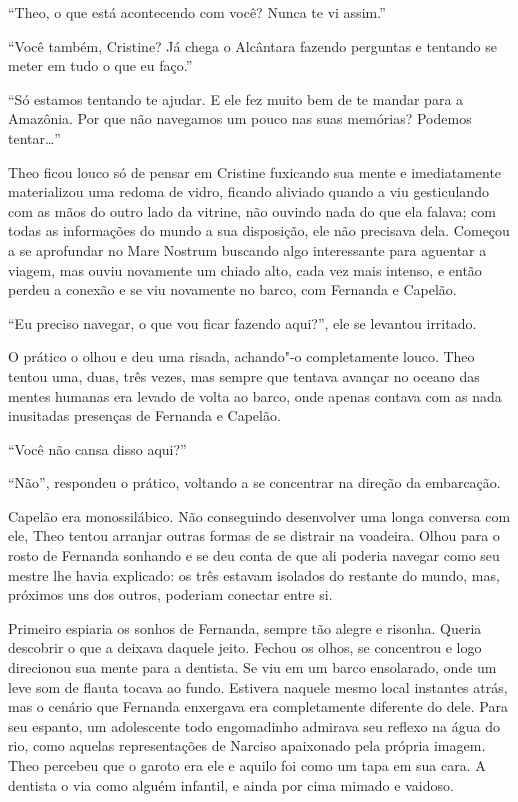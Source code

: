 ``Theo, o que está acontecendo com você? Nunca te vi assim.''

``Você também, Cristine? Já chega o Alcântara fazendo perguntas e
tentando se meter em tudo o que eu faço.''

``Só estamos tentando te ajudar. E ele fez muito bem de te mandar para a
Amazônia. Por que não navegamos um pouco nas suas memórias? Podemos
tentar\ldots{}''

Theo ficou louco só de pensar em Cristine fuxicando sua mente e
imediatamente materializou uma redoma de vidro, ficando aliviado quando
a viu gesticulando com as mãos do outro lado da vitrine, não ouvindo
nada do que ela falava; com todas as informações do mundo a sua
disposição, ele não precisava dela. Começou a se aprofundar no Mare
Nostrum buscando algo interessante para aguentar a viagem, mas ouviu
novamente um chiado alto, cada vez mais intenso, e então perdeu a conexão
e se viu novamente no barco, com Fernanda e Capelão.

``Eu preciso navegar, o que vou ficar fazendo aqui?'', ele se levantou
irritado.

O prático o olhou e deu uma risada, achando"-o completamente louco. Theo
tentou uma, duas, três vezes, mas sempre que tentava avançar no oceano
das mentes humanas era levado de volta ao barco, onde apenas contava com
as nada inusitadas presenças de Fernanda e Capelão.

``Você não cansa disso aqui?''

``Não'', respondeu o prático, voltando a se concentrar na direção da
embarcação.

Capelão era monossilábico. Não conseguindo desenvolver uma longa
conversa com ele, Theo tentou arranjar outras formas de se distrair na
voadeira. Olhou para o rosto de Fernanda sonhando e se deu conta de que
ali poderia navegar como seu mestre lhe havia explicado: os três estavam
isolados do restante do mundo, mas, próximos uns dos outros, poderiam
conectar entre si.

Primeiro espiaria os sonhos de Fernanda, sempre tão alegre e risonha.
Queria descobrir o que a deixava daquele jeito. Fechou os olhos, se
concentrou e logo direcionou sua mente para a dentista. Se viu em um
barco ensolarado, onde um leve som de flauta tocava ao fundo. Estivera
naquele mesmo local instantes atrás, mas o cenário que Fernanda
enxergava era completamente diferente do dele. Para seu espanto, um
adolescente todo engomadinho admirava seu reflexo na água do rio,
como aquelas representações de Narciso apaixonado pela própria
imagem. Theo percebeu que o garoto era ele e aquilo foi como um tapa em
sua cara. A dentista o via como alguém infantil, e ainda por cima mimado
e vaidoso.

